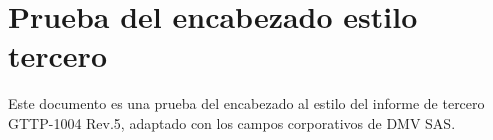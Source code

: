 \documentclass[12pt,a4paper]{article}
\begin{document}
\section{Prueba del encabezado estilo tercero}

Este documento es una prueba del encabezado al estilo del informe de tercero GTTP-1004 Rev.5, adaptado con los campos corporativos de DMV SAS.

\lipsum[1-10]
\end{document}
